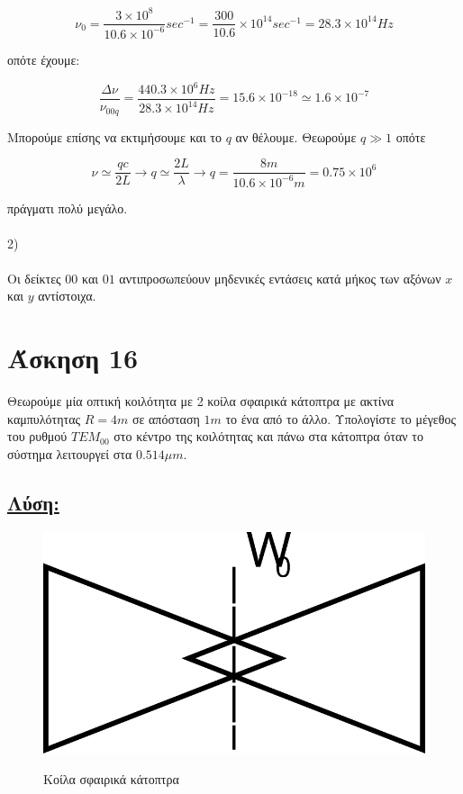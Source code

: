 \documentclass[a4paper,11pt,titlepage]{article}
\makeatletter
\def\maxwidth{
\ifdim\Gin@nat@width>\linewidth
\linewidth
\else
\Gin@nat@width
\fi
}
\makeatother
\begin{document}
\begin{equation}
 \nu_0=\frac{3\times10^8}{10.6\times10^{-6}}sec^{-1}=\frac{300}{10.6}\times10^{14}sec^{-1}=28.3\times10^{14}Hz
\end{equation}

οπότε έχουμε:

\begin{equation}
  \dfrac{\Delta\nu}{\nu_{00q}}=\frac{440.3\times10^6 Hz}{28.3\times10^{14}Hz}=15.6\times10^{-18}\simeq1.6\times10^{-7}
\end{equation}

Μπορούμε επίσης να εκτιμήσουμε και το $q$ αν θέλουμε. Θεωρούμε $q\gg1$ οπότε 

\begin{equation}
\nu\simeq \dfrac{qc}{2L}\longrightarrow q\simeq \dfrac{2L}{\lambda}\longrightarrow q=\dfrac{8m}{10.6\times10^{-6}m}=0.75\times10^6
\end{equation}

πράγματι πολύ μεγάλο.
\\\\
2)
\\\\
Οι δείκτες $00$ και $01$ αντιπροσωπεύουν μηδενικές εντάσεις κατά μήκος των αξόνων $x$ και $y$ αντίστοιχα.

\newpage
\section{Άσκηση 16}

Θεωρούμε μία οπτική κοιλότητα με 2 κοίλα σφαιρικά κάτοπτρα με ακτίνα καμπυλότητας $R=4m$ σε απόσταση $1m$ το ένα από το άλλο. Υπολογίστε το μέγεθος του ρυθμού $TEM_{00}$ στο κέντρο της κοιλότητας και πάνω στα κάτοπτρα όταν το σύστημα λειτουργεί στα $0.514\mu m$.

\subsection*{\underline{Λύση:}}

\begin{figure}[!h]
\centering
\includegraphics[width=\maxwidth]{katoptra.svg}\\[0.3cm]
\caption{Κοίλα σφαιρικά κάτοπτρα}
\end{figure}
\end{document}
